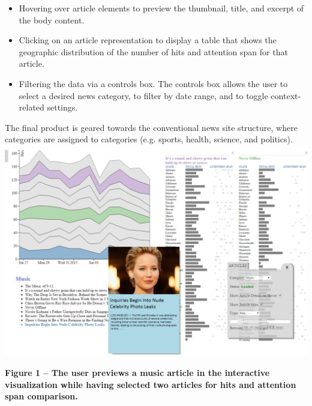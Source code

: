 \documentclass[12pt]{article}
\begin{document}
\begin{itemize}
\item Hovering over article elements to preview the thumbnail, title, and excerpt of the body content.
\item Clicking on an article representation to display a table that shows the geographic distribution of the number of hits and attention span for that article.
\item Filtering the data via a controls box. The controls box allows the user to select a desired news category, to filter by date range, and to toggle context-related settings. 
\end{itemize}

\noindent The final product is geared towards the conventional news site structure, where categories are assigned to categories (e.g. sports, health, science, and politics). \\

\noindent\includegraphics[scale=0.4]{img/in_action} \\

\begin{singlespace}
\noindent\textbf{Figure 1 -- The user previews a music article in the interactive visualization while having selected two articles for hits and attention span comparison.}
\end{singlespace}

\newpage

\iffalse
\end{document}

